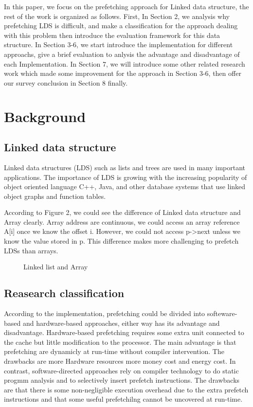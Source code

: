 \documentclass{acm_proc_article-sp}
\begin{document}
In this paper, we focus on the prefetching approach for Linked data
structure, the rest of the work is organized as follows. First, In
Section 2, we analysis why prefetching LDS is difficult, and make a
classification for the approach dealing with this problem then
introduce the evaluation framework for this data structure.  In
Section 3-6, we start introduce the implementation for different
approachs, give a brief evaluation to anlysis the advantage and
disadvantage of each Implementation. In
Section 7, we will introduce some other related 
research work which made some improvement for the approach in Section
3-6, then offer our survey conclusion in Section 8 finally.

\section{Background}

\subsection{Linked data structure}

Linked data structures (LDS) such as lists and trees are used in
many important applications. The importance of LDS is growing
with the increasing popularity of object oriented language C++, Java,
and other database systems that use linked object graphs and function tables. 
\cite{Vanderwiel:2000:DPM:358923.358939}

According to Figure 2, we could see the difference of Linked data
structure and Array clearly. Array address are continuous,
we could  access an array reference A[i] once we know the offset
i. However,  we could not access p->next unless we know the value stored in p. 
This difference makes more challenging to prefetch LDSs than arrays.

\begin{figure}
\centering
{}
\caption{Linked list and Array}
\end{figure}

\subsection{Reasearch classification}

According to the implementation, prefetching could be divided into
softeware-based and hardware-based approaches,  
either way has its advantage and
disadvantage.\cite{Chen:1994:PSS:192007.192030}  
Hardware-based prefetching  requires some extra unit connected to
the cache but little modification to the processor. The main advantage is that
prefetching are dynamicly at run-time without compiler intervention. The
drawbacks are more Hardware resources more money cost and energy cost.
In contrast, software-directed approaches 
rely on compiler technology to do static progmm analysis 
and to selectively insert prefetch instructions.
The drawbacks are that there is some non-negligible
execution overhead due to the extra prefetch instructions and 
that some useful prefetchilng cannot be uncovered at run-time.
\cite{Guo:2011:EHD:1993125.1993134}\cite{Baer:1995:EHD:626514.627012}
\end{document}
